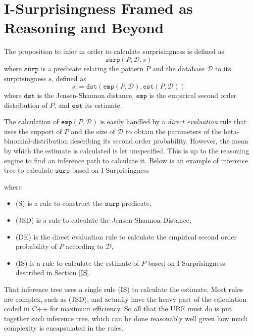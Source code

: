 \documentclass[runningheads]{llncs}
\begin{document}
\section{I-Surprisingness Framed as Reasoning and Beyond}
\label{ISRB}

The proposition to infer in order to calculate surprisingness is
defined as
$$
\texttt{surp}(P, \mathcal{D}, s)
$$ where $\texttt{surp}$ is a predicate relating the pattern $P$ and
the database $\mathcal{D}$ to its surprisingness $s$, defined as
$$
s := \texttt{dst}(\texttt{emp}(P,\mathcal{D}),\texttt{est}(P,\mathcal{D}))
$$ where $\texttt{dst}$ is the Jensen-Shannon distance, $\texttt{emp}$
is the empirical second order distribution of $P$, and $\texttt{est}$
its estimate.

The calculation of $\texttt{emp}(P, \mathcal{D})$ is easily handled by
a \emph{direct evaluation} rule that uses the support of $P$ and the
size of $\mathcal{D}$ to obtain the parameters of the
beta-binomial-distribution describing its second order probability.
However, the mean by which the estimate is calculated is let
unspecified. This is up to the reasoning engine to find an inference
path to calculate it. Below is an example of inference tree to
calculate $\texttt{surp}$ based on I-Surprisingness
\begin{prooftree}




\end{prooftree}
where
\begin{itemize}
\item (S) is a rule to construct the $\texttt{surp}$ predicate,
\item (JSD) is a rule to calculate the Jensen-Shannon Distance,
\item (DE) is the direct evaluation rule to calculate the empirical
  second order probability of $P$ according to $\mathcal{D}$,
\item (IS) is a rule to calculate the estimate of $P$ based on
  I-Surprisingness described in Section \ref{IS}.
\end{itemize}
That inference tree uses a single rule (IS) to calculate the
estimate. Most rules are complex, such as (JSD), and actually have the
heavy part of the calculation coded in C++ for maximum efficiency. So
all that the URE must do is put together such inference tree, which
can be done reasonably well given how much complexity is encapsulated
in the rules.
\end{document}

